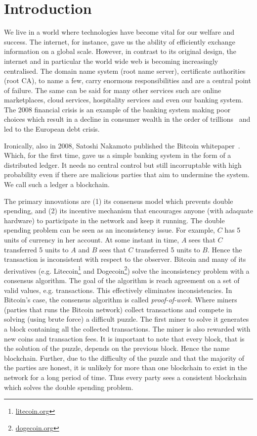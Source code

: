 \chapter{Introduction}
\label{ch:intro}

We live in a world where technologies have become vital for our welfare and success.
The internet, for instance, gave us the ability of efficiently exchange information on a global scale.
However, in contrast to its original design, the internet and in particular the world wide web is becoming increasingly centralised.
The domain name system (root name server), certificate authorities (root CA), to name a few, carry enormous responsibilities and are a central point of failure.
The  same can be said for many other services such are online marketplaces,
cloud services, hospitality services and even our banking system.
The 2008 financial crisis is an example of the banking system making poor choices which result in a
decline in consumer wealth in the order of trillions~\cite{financialcrisis} and led to the European debt crisis.

Ironically, also in 2008, Satoshi Nakamoto published the Bitcoin whitepaper~\cite{bitcoin}.
Which, for the first time, gave us a simple banking system in the form of a distributed ledger.
It needs no central control but still incorruptable with high probability even if there are malicious parties that aim to undermine the system.
We call such a ledger a blockchain.

The primary innovations are (1) its consensus model which prevents double spending,
and (2) its incentive mechanism that encourages anyone (with adaquate hardware) to participate in the network and keep it running.
The double spending problem can be seen as an inconsistency issue.
For example, $C$ has 5 units of currency in her account.
At some instant in time, $A$ sees that $C$ transferred 5 units to $A$ and $B$ sees that $C$ transferred 5 units to $B$.
Hence the transaction is inconsistent with respect to the observer.
Bitcoin and many of its derivatives (e.g. Litecoin\footnote{\url{litecoin.org}} and Dogecoin\footnote{\url{dogecoin.org}}) solve the inconsistency problem with a consensus algorithm.
The goal of the algorithm is reach agreement on a set of valid values, e.g. transactions. 
This effectively eliminates inconsistencies.
In Bitcoin's case, the consensus algorithm is called \emph{proof-of-work}.
Where miners (parties that runs the Bitcoin network) collect transactions and compete in solving (using brute force) a difficult puzzle.
The first miner to solve it generates a block containing all the collected transactions.
The miner is also rewarded with new coins and transaction fees.
It is important to note that every block, that is the solution of the puzzle,
depends on the previous block.
Hence the name blockchain.
Further, due to the difficulty of the puzzle and that the majority of the parties are honest,
it is unlikely for more than one blockchain to exist in the network for a long period of time.
Thus every party sees a consistent blockchain which solves the double spending problem.

